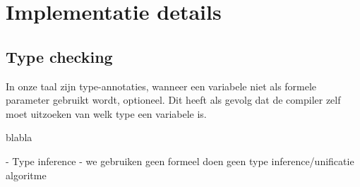 \chapter{Implementatie details}
\section{Type checking}
In onze taal zijn type-annotaties, wanneer een variabele niet als formele parameter gebruikt wordt, optioneel. Dit heeft als gevolg dat de compiler zelf moet uitzoeken van welk type een variabele is.

blabla

- Type inference
- we gebruiken geen formeel doen geen type inference/unificatie algoritme
